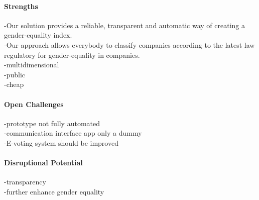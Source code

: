 \paragraph*{Strengths}
-Our solution provides a reliable, transparent and automatic way of creating a gender-equality index.\\
-Our approach allows everybody to classify companies according to the latest law regulatory for gender-equality in companies.\\
-multidimensional\\
-public\\
-cheap\\



\paragraph*{Open Challenges}
-prototype not fully automated\\
-communication interface app only a dummy\\
-E-voting system should be improved\\

	
\paragraph*{Disruptional Potential}
-transparency\\
-further enhance gender equality